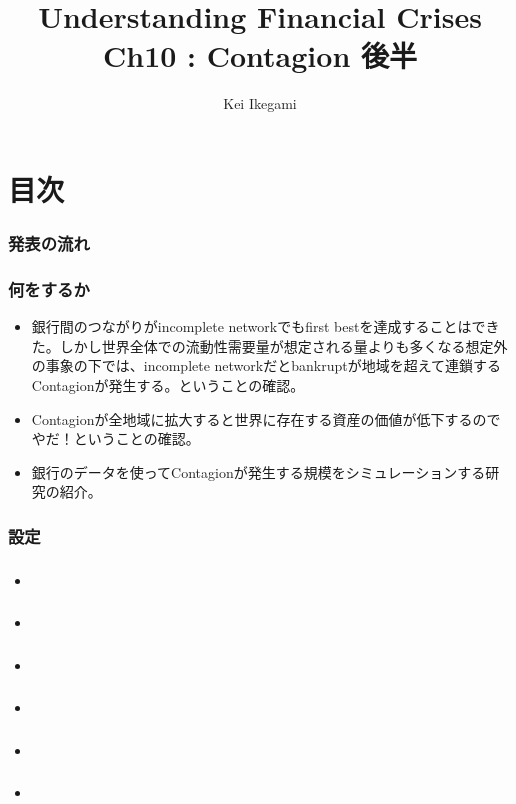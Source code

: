 \documentclass[dvipdfmx, 12pt]{beamer}
\title{Understanding Financial Crises\\Ch10 : Contagion 後半}
\author{Kei Ikegami}
\begin{document}
\newcommand{\argmin}{\mathop{\rm arg~min}\limits}

\frame{\maketitle}

\section*{目次}
\begin{frame} \frametitle{発表の流れ}
\tableofcontents
\end{frame}

\begin{frame}\frametitle{何をするか}
	\begin{itemize}
	\item 銀行間のつながりがincomplete networkでもfirst bestを達成することはできた。しかし世界全体での流動性需要量が想定される量よりも多くなる想定外の事象の下では、incomplete networkだとbankruptが地域を超えて連鎖するContagionが発生する。ということの確認。
	\item Contagionが全地域に拡大すると世界に存在する資産の価値が低下するのでやだ！ということの確認。
	\item 銀行のデータを使ってContagionが発生する規模をシミュレーションする研究の紹介。
	\end{itemize}
\end{frame}

\begin{frame}\frametitle{設定}
	
\end{frame}

\begin{frame}\frametitle{}
	\begin{itemize}
	\item 
	\end{itemize}
\end{frame}

\begin{frame}\frametitle{}
	\begin{itemize}
	\item 
	\end{itemize}
\end{frame}

\begin{frame}\frametitle{}
	\begin{itemize}
	\item 
	\end{itemize}
\end{frame}

\begin{frame}\frametitle{}
	\begin{itemize}
	\item 
	\end{itemize}
\end{frame}

\begin{frame}\frametitle{}
	\begin{itemize}
	\item 
	\end{itemize}
\end{frame}

\begin{frame}\frametitle{}
	\begin{itemize}
	\item 
	\end{itemize}
\end{frame}
\end{document}
